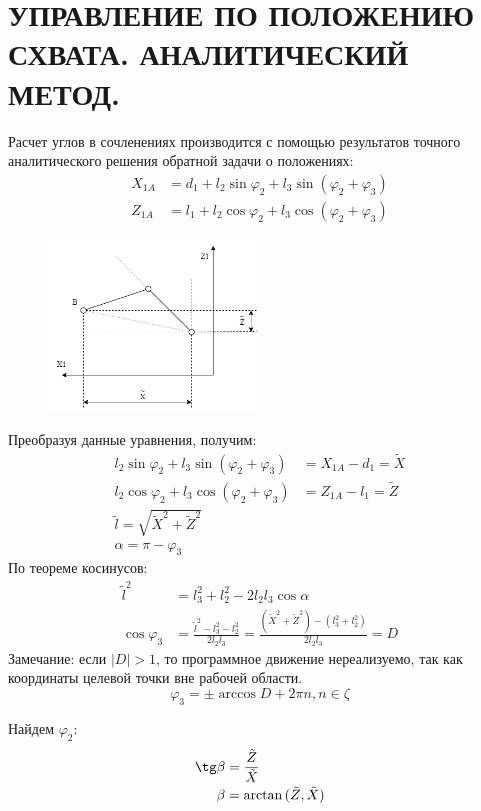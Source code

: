 \chapter{\MakeUppercase{Управление по положению схвата. Аналитический метод. }}

Расчет углов в сочленениях производится с помощью результатов точного аналитического решения обратной задачи о положениях:
\begin{align*}
    X_{1A}&=d_1+l_2\sin\varphi_2+l_3\sin{(\varphi_2+\varphi_3)} \\
   Z_{1A}&=l_1+l_2\cos\varphi_2+l_3\cos{(\varphi_2+\varphi_3)} \label{eq:graph} \tag{1}
\end{align*}

\begin{figure}[ht!]
    \centering
    \includegraphics[width=0.5\textwidth]{chapter_x1/figure1.png}
\end{figure}

Преобразуя данные уравнения, получим:
\begin{align*}
    l_2\sin\varphi_2+l_3\sin{(\varphi_2+\varphi_3)}&=X_{1A}-d_1=\tilde X \\
   l_2\cos\varphi_2+l_3\cos{(\varphi_2+\varphi_3)}&=Z_{1A}-l_1=\tilde Z \\
   \tilde l=\sqrt{\tilde X^2+\tilde Z^2} \\
   \alpha=\pi-\varphi_3
\end{align*}
По теореме косинусов:
\begin{align*}
    \tilde l^2 &= l_3^2+l_2^2-2 l_2 l_3 \cos\alpha\\ 
     \cos\varphi_3 &= \frac{\tilde l^2-l_3^2-l_2^2}{2l_2l_3}=\frac{(\tilde X^2+\tilde Z^2)-(l_3^2+l_2^2)}{2l_2l_3}=D
\end{align*}
Замечание: если $|D|>1$, то программное движение нереализуемо, так как координаты целевой точки вне рабочей области.
$$\varphi_3=\pm \arccos{D+2\pi n}, n\in\zeta$$

Найдем $\varphi_2$:
\begin{align*}
\tg\beta&=\frac{\tilde Z}{\tilde X} \\
\beta&=\arctan{(\tilde Z,\tilde X)}
\end{align*}

